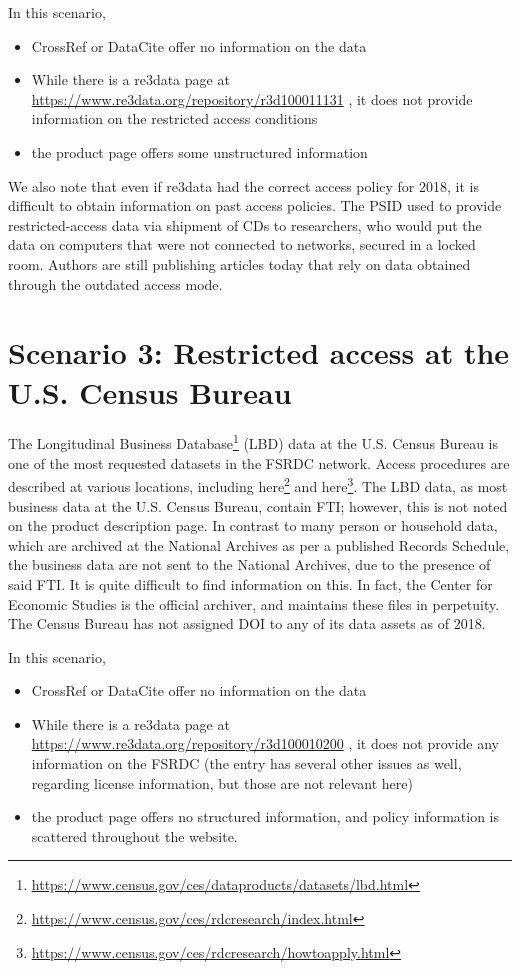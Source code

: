 \documentclass[10pt,letterpaper]{article}
\newcommand{\urlcite}[2]{#2\footnote{\url{#1}}}
\begin{document}
In this scenario, 
\begin{itemize}
	\item CrossRef or DataCite offer no information on the data
	\item While there is a re3data page at \url{https://www.re3data.org/repository/r3d100011131} \parencite{Re3data-psid}, it does not provide information on the restricted access conditions
	\item the product page offers some unstructured information
\end{itemize}
We also note that even if re3data had the correct access policy for 2018, it is difficult to obtain information on past access policies. The \ac{PSID} used to provide restricted-access data via shipment of CDs to researchers, who would put the data on computers that were not connected to networks, secured in a locked room. Authors are still publishing articles today that rely on data obtained through the outdated access mode. 

\section{Scenario 3: Restricted access at the U.S. Census Bureau}

The \urlcite{https://www.census.gov/ces/dataproducts/datasets/lbd.html}{Longitudinal Business Database} (LBD) data at the U.S. Census Bureau is one of the most requested datasets in the \ac{FSRDC} network. Access procedures are described at various locations, including \urlcite{https://www.census.gov/ces/rdcresearch/index.html}{here} and \urlcite{https://www.census.gov/ces/rdcresearch/howtoapply.html}{here}. The LBD data, as most business data at the U.S. Census Bureau, contain \ac{FTI}; however, this is not noted on the product description page. In contrast to many person or household data, which are archived at the National Archives as per a published Records Schedule, the business data are not sent to the National Archives, due to the presence of said \ac{FTI}. It is quite difficult to find information on this. In fact, the Center for Economic Studies is the official archiver, and maintains these files in perpetuity. The Census Bureau has not assigned \ac{DOI} to any of its data assets as of 2018.


In this scenario, 
\begin{itemize}
	\item CrossRef or DataCite offer no information on the data
	\item While there is a re3data page at \url{https://www.re3data.org/repository/r3d100010200} \parencite{Re3data-uscb}, it does not provide any information on the \ac{FSRDC} (the entry has several other issues as well, regarding license information, but those are not relevant here)
	\item the product page offers no structured information, and policy information is scattered throughout the website.
\end{itemize}

%
%
\printbibliography[title=References Cited]
\end{document}
